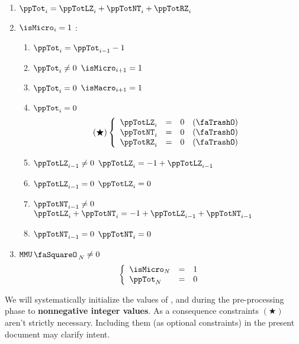 \begin{enumerate} [resume]
	\item $\ppTot_{i} = \ppTotLZ_{i} + \ppTotNT_{i} + \ppTotRZ_{i}$
	\item \If $\isMicro_{i}=1$ \Then:
		\begin{enumerate}
			\item $\ppTot_{i}=\ppTot_{i - 1} - 1$ 
			\item \If $\ppTot_{i} \neq 0$ \Then $\isMicro_{i + 1}=1$
			\item \If $\ppTot_{i} =    0$ \Then $\isMacro_{i + 1}=1$
			\item \If $\ppTot_{i} = 0$ \Then
				\[
					(\bigstar)
					\left\{ \begin{array}{lcl}
						\ppTotLZ_{i}       & = & 0 \quad (\trash) \\ 
						\ppTotNT_{i}       & = & 0 \quad (\trash) \\ 
						\ppTotRZ_{i}       & = & 0 \quad (\trash) \\ 
					\end{array} \right.
				\]
			\item \If $\ppTotLZ_{i - 1} \neq 0$ \Then $\ppTotLZ_{i} = -1 + \ppTotLZ_{i - 1}$
			\item \If $\ppTotLZ_{i - 1} = 0$ \Then $\ppTotLZ_{i} = 0$
			\item \If $\ppTotNT_{i - 1} \neq 0$ \Then $\ppTotLZ_{i} + \ppTotNT_{i} = -1 + \ppTotLZ_{i - 1} + \ppTotNT_{i - 1}$
			\item \If $\ppTotNT_{i - 1} = 0$ \Then $\ppTotNT_{i} = 0$ 
		\end{enumerate}
	\item \If $\mmuStamp_{N} \neq 0$ \Then
		\[
			\left\{ \begin{array}{lcl}
				\isMicro_{N}   & = & 1 \\
				\ppTot_{N}     & = & 0 \\
			\end{array} \right.
		\]
\end{enumerate}
\saNote{} We will systematically initialize the values of
\ppTotLZ{},
\ppTotNT{} and
\ppTotRZ{}
during the pre-processing phase to \textbf{nonnegative integer values}.
As a consequence constraints $(\bigstar)$ aren't strictly necessary.
Including them (as optional constraints) in the present document may clarify intent.
